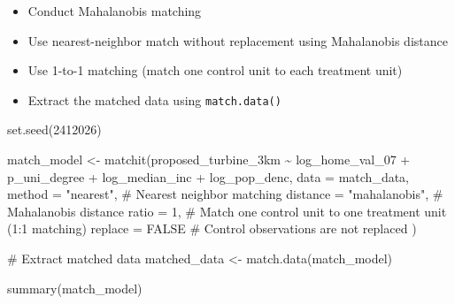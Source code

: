 \documentclass[
  letterpaper,
  DIV=11,
  numbers=noendperiod]{scrartcl}
\newenvironment{Shaded}{\begin{snugshade}}{\end{snugshade}}
\newcommand{\AttributeTok}[1]{\textcolor[rgb]{0.40,0.45,0.13}{#1}}
\newcommand{\CommentTok}[1]{\textcolor[rgb]{0.37,0.37,0.37}{#1}}
\newcommand{\ConstantTok}[1]{\textcolor[rgb]{0.56,0.35,0.01}{#1}}
\newcommand{\DecValTok}[1]{\textcolor[rgb]{0.68,0.00,0.00}{#1}}
\newcommand{\FunctionTok}[1]{\textcolor[rgb]{0.28,0.35,0.67}{#1}}
\newcommand{\NormalTok}[1]{\textcolor[rgb]{0.00,0.23,0.31}{#1}}
\newcommand{\OtherTok}[1]{\textcolor[rgb]{0.00,0.23,0.31}{#1}}
\newcommand{\SpecialCharTok}[1]{\textcolor[rgb]{0.37,0.37,0.37}{#1}}
\newcommand{\StringTok}[1]{\textcolor[rgb]{0.13,0.47,0.30}{#1}}
\providecommand{\tightlist}{%
  \setlength{\itemsep}{0pt}\setlength{\parskip}{0pt}}
\begin{document}
\begin{itemize}
\tightlist
\item
  Conduct Mahalanobis matching\\
\item
  Use nearest-neighbor match without replacement using Mahalanobis
  distance
\item
  Use 1-to-1 matching (match one control unit to each treatment unit)
\item
  Extract the matched data using \texttt{match.data()}
\end{itemize}

\begin{Shaded}
\begin{Highlighting}[]
\FunctionTok{set.seed}\NormalTok{(}\DecValTok{2412026}\NormalTok{)}

\NormalTok{match\_model }\OtherTok{\textless{}{-}} \FunctionTok{matchit}\NormalTok{(proposed\_turbine\_3km }\SpecialCharTok{\textasciitilde{}}\NormalTok{ log\_home\_val\_07 }\SpecialCharTok{+} 
\NormalTok{    p\_uni\_degree }\SpecialCharTok{+}
\NormalTok{    log\_median\_inc }\SpecialCharTok{+}
\NormalTok{    log\_pop\_denc,}
  \AttributeTok{data =}\NormalTok{ match\_data, }
  \AttributeTok{method =} \StringTok{"nearest"}\NormalTok{,       }\CommentTok{\# Nearest neighbor matching}
  \AttributeTok{distance =} \StringTok{"mahalanobis"}\NormalTok{, }\CommentTok{\# Mahalanobis distance}
  \AttributeTok{ratio =} \DecValTok{1}\NormalTok{,                }\CommentTok{\# Match one control unit to one treatment unit (1:1 matching)}
  \AttributeTok{replace =} \ConstantTok{FALSE}           \CommentTok{\# Control observations are not replaced}
\NormalTok{)}

\CommentTok{\# Extract matched data}
\NormalTok{matched\_data }\OtherTok{\textless{}{-}} \FunctionTok{match.data}\NormalTok{(match\_model)}
\end{Highlighting}
\end{Shaded}

\begin{Shaded}
\begin{Highlighting}[]
\FunctionTok{summary}\NormalTok{(match\_model)}
\end{Highlighting}
\end{Shaded}
\end{document}
